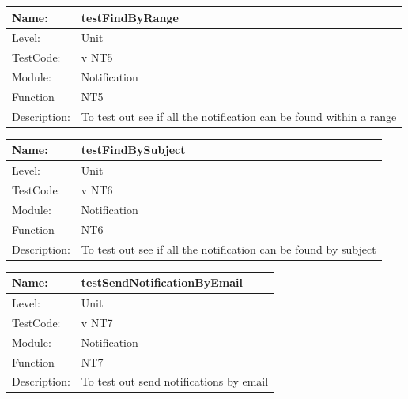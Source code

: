 \documentclass[12pt]{article}
\begin{document}
\begin{center}
\begin{tabular}{|l|p{12cm}|}
\hline

 Name: & testFindByRange  \\
\hline
Level: & Unit \\
\hline
TestCode: & v NT5 \\
\hline
Module:& Notification\\
\hline
Function & NT5 \\
\hline
Description: & To test out see if all the notification can be found within a range \\
\hline

\end{tabular}
\end{center}

\begin{center}
\begin{tabular}{|l|p{12cm}|}
\hline

 Name: & testFindBySubject  \\
\hline
Level: & Unit \\
\hline
TestCode: & v NT6 \\
\hline
Module:& Notification\\
\hline
Function & NT6 \\
\hline
Description: & To test out see if all the notification can be found by subject \\
\hline

\end{tabular}
\end{center}

\begin{center}
\begin{tabular}{|l|p{12cm}|}
\hline

 Name: & testSendNotificationByEmail \\
\hline
Level: & Unit \\
\hline
TestCode: & v NT7 \\
\hline
Module:& Notification\\
\hline
Function & NT7 \\
\hline
Description: & To test out send notifications by email \\
\hline

\end{tabular}
\end{center}
\end{document}
